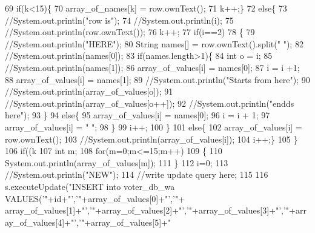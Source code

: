 \begin{DoxyCode}
{69         \textcolor{keywordflow}{if}(k<15)\{
70         array\_of\_names[k] = row.ownText();
71         k++;\}
72         \textcolor{keywordflow}{else}\{
73             \textcolor{comment}{//System.out.println("row is");}
74             \textcolor{comment}{//System.out.println(i);}
75             \textcolor{comment}{//System.out.println(row.ownText());}
76             k++;
77             \textcolor{keywordflow}{if}(i==2)
78             \{
79                     \textcolor{comment}{//System.out.println("HERE");}
80                 String names[] = row.ownText().split(\textcolor{stringliteral}{" "});
82                 \textcolor{comment}{//System.out.println(names[0]);}
83                 \textcolor{keywordflow}{if}(names.length>1)\{
84                     \textcolor{keywordtype}{int} o = i;
85                     \textcolor{comment}{//System.out.println(names[1]);}
86             array\_of\_values[i] = names[0];
87             i = i +1;
88             array\_of\_values[i] = names[1];
89             \textcolor{comment}{//System.out.println("Starts from here");}
90             \textcolor{comment}{//System.out.println(array\_of\_values[o]);}
91             \textcolor{comment}{//System.out.println(array\_of\_values[o++]);}
92             \textcolor{comment}{//System.out.println("endds here");}
93             \}
94                 \textcolor{keywordflow}{else}\{
95                     array\_of\_values[i] = names[0];
96                     i = i + 1;
97                     array\_of\_values[i] = \textcolor{stringliteral}{" "};
98                 \}
99             i++;
100             \}
101             \textcolor{keywordflow}{else}\{
102             array\_of\_values[i] = row.ownText();
103             \textcolor{comment}{//System.out.println(array\_of\_values[i]);}
104             i++;\}
105         \}
106         \textcolor{keywordflow}{if}((k%
107             \textcolor{keywordtype}{int} m;
108             \textcolor{keywordflow}{for}(m=0;m<=15;m++)
109             \{
110                 System.out.println(array\_of\_values[m]);
111             \}
112             i=0;
113             \textcolor{comment}{//System.out.println("NEW");}
114             \textcolor{comment}{//write update query here;}
115         
116         s.executeUpdate(\textcolor{stringliteral}{"INSERT into voter\_db\_wa VALUES('"}+\textcolor{keywordtype}{id}+\textcolor{stringliteral}{"','"}+array\_of\_values[0]+\textcolor{stringliteral}{"','"}+
      array\_of\_values[1]+\textcolor{stringliteral}{"','"}+array\_of\_values[2]+\textcolor{stringliteral}{"','"}+array\_of\_values[3]+\textcolor{stringliteral}{"','"}+array\_of\_values[4]+\textcolor{stringliteral}{"','"}+array\_of\_values[5]+\textcolor{stringliteral}{"
}}
\end{DoxyCode}
